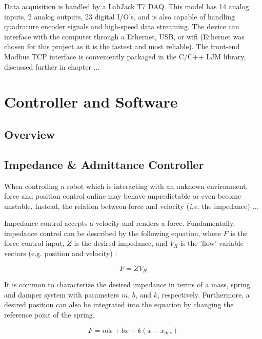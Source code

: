\documentclass[12pt]{report}
\begin{document}
	Data acquisition is handled by a LabJack T7 DAQ. This model has 14 analog inputs, 2 analog outputs, 23 digital I/O's, and is also capable of handling quadrature encoder signals and high-speed data streaming. The device can interface with the computer through a Ethernet, USB, or wifi (Ethernet was chosen for this project as it is the fastest and most reliable). The front-end Modbus TCP interface is conveniently packaged in the C/C++ LJM library, discussed further in chapter ... 

\chapter{Controller and Software}

	\section{Overview}
	\section{Impedance \& Admittance Controller}

%

When controlling a robot which is interacting with an unknown environment, force and position control online may behave unpredictable or even become unstable. Instead, the relation between force and velocity (\textit{i.e.} the impedance) ...


Impedance control accepts a velocity and renders a force. Fundamentally, impedance control can be described by the following equation, where $F$ is the force control input, $Z$ is the desired impedance, and $V_R$ is the 'flow' variable vectors (e.g. position and velocity) :

\begin{equation}
	F = ZV_R 
\end{equation} 

It is common to characterize the desired impedance in terms of a mass, spring and damper system with parameters $m$, $b$, and $k$, respectively. Furthermore, a desired position can also be integrated into the equation by changing the reference point of the spring. 

\begin{equation}
	F = m\ddot{x} + b\dot{x} + k(x - x_{des})
\end{equation} 
\end{document}
